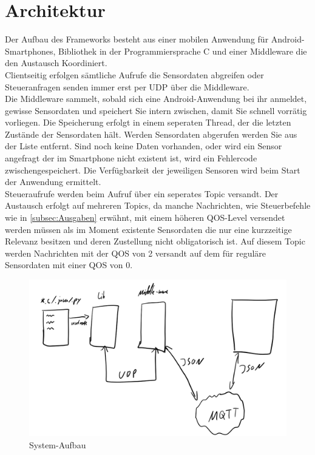 \documentclass[11pt,a4paper]{report}
\begin{document}
\chapter{Architektur} \label{chap:architektur}
Der Aufbau des Frameworks besteht aus einer mobilen Anwendung für Android-Smartphones, Bibliothek in der Programmiersprache C und einer Middleware die den Austausch Koordiniert.
\\
Clientseitig erfolgen sämtliche Aufrufe die Sensordaten abgreifen oder Steueranfragen senden immer erst per UDP über die Middleware.
\\
Die Middleware sammelt, sobald sich eine Android-Anwendung bei ihr anmeldet, gewisse Sensordaten und speichert Sie intern zwischen, damit Sie schnell vorrätig vorliegen.
Die Speicherung erfolgt in einem seperaten Thread, der die letzten Zustände der Sensordaten hält.
Werden Sensordaten abgerufen werden Sie aus der Liste entfernt.
Sind noch keine Daten vorhanden, oder wird ein Sensor angefragt der im Smartphone nicht existent ist, wird ein Fehlercode zwischengespeichert.
Die Verfügbarkeit der jeweiligen Sensoren wird beim Start der Anwendung ermittelt.
\\
Steueraufrufe werden beim Aufruf über ein seperates Topic versandt.
Der Austausch erfolgt auf mehreren Topics, da manche Nachrichten, wie Steuerbefehle wie in \ref{subsec:Ausgaben} erwähnt, mit einem höheren QOS-Level versendet werden müssen als im Moment existente Sensordaten die nur eine kurzzeitige Relevanz besitzen und deren Zustellung nicht obligatorisch ist.
Auf diesem Topic werden Nachrichten mit der QOS von 2 versandt auf dem für reguläre Sensordaten mit einer QOS von 0.
\begin{figure}[htbp]
  \centering
  \includegraphics[width=.9\textwidth]{images/design.png}
  \caption{System-Aufbau}
  \label{fig:design}
\end{figure}
\end{document}
